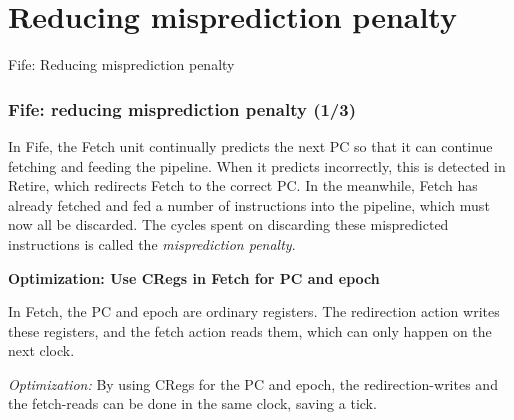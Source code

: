 
\section{Reducing misprediction penalty}

\begin{frame}

\begin{center}
  {\LARGE Fife: Reducing misprediction penalty}
\end{center}

\end{frame}


\begin{frame}[fragile]
\frametitle{Fife: reducing misprediction penalty (1/3)}

\footnotesize

In Fife, the Fetch unit continually predicts the next PC so that it
can continue fetching and feeding the pipeline.  When it predicts
incorrectly, this is detected in Retire, which redirects Fetch to the
correct PC. In the meanwhile, Fetch has already fetched and fed a
number of instructions into the pipeline, which must now all be
discarded.  The cycles spent on discarding these mispredicted
instructions is called the \emph{misprediction penalty}.

\PAUSE{\vxxxx}
\vxxxx

\hdivider

{\bf Optimization: Use CRegs in Fetch for PC and epoch}

\vxx

In Fetch, the PC and epoch are ordinary registers.  The redirection
action writes these registers, and the fetch action reads them, which
can only happen on the next clock.

\vxx

\emph{Optimization:} By using CRegs for the PC and epoch, the
redirection-writes and the fetch-reads can be done in the same clock,
saving a tick.

\end{frame}


